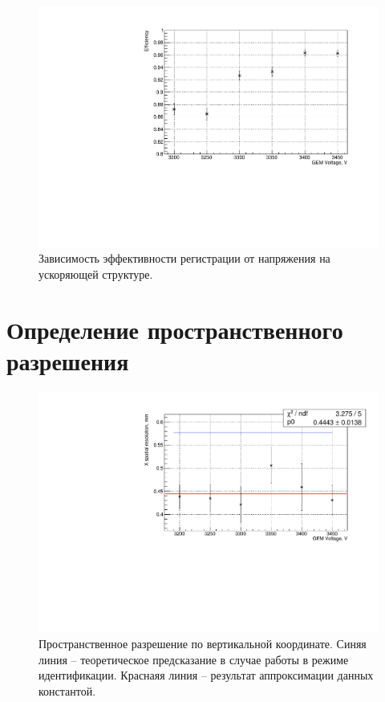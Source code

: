 \begin{figure}[h]
	\centering
	\includegraphics[width= 12cm]{img/eff_plot.pdf}
	\caption{Зависимость эффективности регистрации от напряжения на ускоряющей структуре.}
	\label{fig:eff_gr}
\end{figure}

\section{Определение пространственного разрешения}

\begin{figure}[h]
	\centering
	\includegraphics[width= 12cm]{img/x_sp_res.pdf}
	\caption{Пространственное разрешение по вертикальной координате. Синяя линия -- теоретическое предсказание в случае работы в режиме идентификации. Краснаяя линия -- результат аппроксимации данных константой.}
	\label{fig:x_sp_res}
\end{figure}

